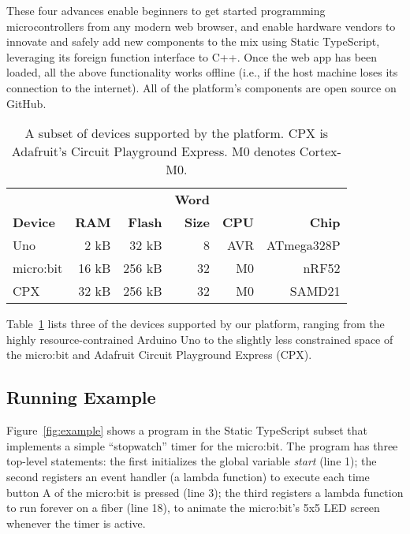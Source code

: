 These four advances enable beginners to get started programming microcontrollers from 
any modern web browser, and enable hardware vendors to innovate and safely add new 
components to the mix using Static TypeScript, leveraging its
foreign function interface to C++.
Once the web app has been loaded, all the above functionality works offline 
(i.e., if the host machine loses its connection
to the internet). All of the platform's components are open source on GitHub. 

\begin{table}[]
\centering
\begin{tabular}{|l|r|r|r|r|r|}
\hline
            &          &            & \bf{Word} &          &             \\
\bf{Device} & \bf{RAM} & \bf{Flash} & \bf{Size} & \bf{CPU} & \bf{Chip}   \\ \hline
Uno         & 2 kB     & 32 kB      & 8         & AVR      & ATmega328P  \\ \hline
micro:bit   & 16 kB    & 256 kB     & 32        & M0       & nRF52       \\ \hline
CPX         & 32 kB    & 256 kB     & 32        & M0       & SAMD21      \\ \hline
\end{tabular}
\caption{\label{table:devices}A subset of devices supported by the platform. 
CPX is Adafruit's Circuit Playground Express. M0 denotes Cortex-M0.}
\end{table}
      
Table~\ref{table:devices} lists three of the devices supported by our platform, ranging
from the highly resource-contrained Arduino Uno to the slightly less constrained space of
the micro:bit and Adafruit Circuit Playground Express (CPX).


\subsection{Running Example}

Figure~\ref{fig:example} shows a program in the Static
TypeScript subset that implements a simple ``stopwatch'' timer
for the micro:bit.
The program has three top-level statements:
the first initializes the global variable \emph{start} (line 1); the
second registers an event handler (a lambda function) to execute
each time button A of the micro:bit is pressed (line 3); the
third registers a lambda function to run forever on a fiber (line 18),
to animate the micro:bit's 5x5 LED screen whenever the timer is active. 

